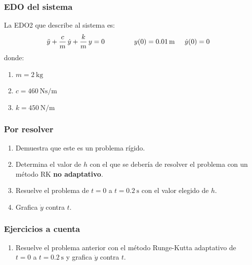 \documentclass[12pt]{beamer}
\begin{document}
\begin{frame}
\frametitle{EDO del sistema}
La EDO2 que describe al sistema es:
\pause
\begin{align*}
\ddot{y} +  \dfrac{c}{m} \, \dot{y} + \dfrac{k}{m} \, y = 0 \hspace{1.5cm} y (0) = \SI{0.01}{\meter} \hspace{0.5cm} \dot{y} (0) = 0
\end{align*}
\pause
donde:
\begin{enumerate}
\item $m = \SI{2}{\kilo\gram}$
\item $c = \SI{460}{\newton\second\per\metre}$
\item $k = \SI{450}{\newton\per\metre}$
\end{enumerate}
\end{frame}
\begin{frame}
\frametitle{Por resolver}
\begin{enumerate}
\item Demuestra que este es un problema rígido.
\item Determina el valor de $h$ con el que se debería de resolver el problema con un método RK \textbf{no adaptativo}.
\item Resuelve el problema de $t = 0$ a $t = \SI{0.2}{\second}$ con el valor elegido de $h$.
\item Grafica $\dot{y}$ contra $t$.
\end{enumerate}
\end{frame}
\begin{frame}
\frametitle{Ejercicios a cuenta}
\begin{enumerate}
\conti
\item Resuelve el problema anterior con el método Runge-Kutta adaptativo de $t = 0$ a $t = \SI{0.2}{\second}$  y grafica $\dot{y}$ contra $t$.
\seti
\end{enumerate}
\end{frame}
\end{document}
